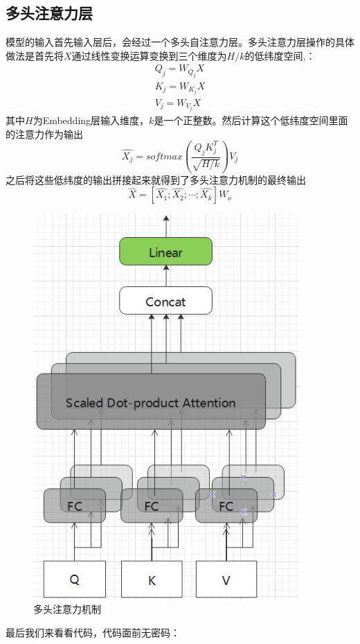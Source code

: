 \documentclass[twoside,a4paper,12pt]{book}%
\begin{document}
\subsection{多头注意力层}
模型的输入首先输入层后，会经过一个多头自注意力层。多头注意力层操作的具体做法是首先将$X$通过线性变换运算变换到三个维度为$H/k$的低纬度空间,：
$$
\begin{aligned}
Q_j = W_{Q_j}X\\
K_j = W_{K_j}X\\
V_j = W_{V_j}X
\end{aligned}
$$
其中$H$为Embedding层输入维度，$k$是一个正整数。然后计算这个低纬度空间里面的注意力作为输出
$$
\hat{X_j} = softmax(\frac{Q_jK_j^T}{\sqrt{H/k}})V_j
$$
之后将这些低纬度的输出拼接起来就得到了多头注意力机制的最终输出
$$
\hat{X} = [\hat{X_1};\hat{X_2};\cdots;\hat{X_k}]W_o
$$
\begin{figure}[htbp]
\begin{center}
\includegraphics[width=4.0in]{figures/bert1.png}
\caption{多头注意力机制}
\label{fig:bert1}
\end{center}
\end{figure}

最后我们来看看代码，代码面前无密码：
\end{document}
